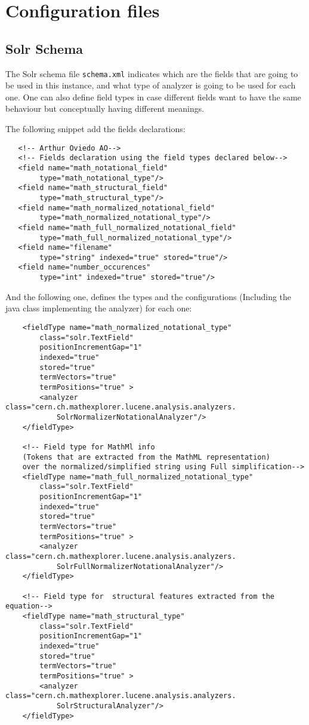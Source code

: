 \chapter{Configuration files}

\section{Solr Schema}
The Solr schema file \verb|schema.xml| indicates which are the fields that are going to be used in this instance, and what type of analyzer is going to be used for each one. One can also define field types in case different fields want to have the same behaviour but conceptually having different meanings. 

The following snippet add the fields declarations:

\begin{verbatim}
   <!-- Arthur Oviedo AO-->
   <!-- Fields declaration using the field types declared below-->
   <field name="math_notational_field" 
   		type="math_notational_type"/>
   <field name="math_structural_field" 
   		type="math_structural_type"/>
   <field name="math_normalized_notational_field" 
   		type="math_normalized_notational_type"/>
   <field name="math_full_normalized_notational_field" 
   		type="math_full_normalized_notational_type"/>
   <field name="filename" 
   		type="string" indexed="true" stored="true"/>
   <field name="number_occurences" 
   		type="int" indexed="true" stored="true"/>
\end{verbatim}

And the following one, defines the types and the configurations (Including the java class implementing the analyzer) for each one:

\begin{verbatim}
	<fieldType name="math_normalized_notational_type" 
		class="solr.TextField" 
		positionIncrementGap="1"
		indexed="true" 
		stored="true" 
		termVectors="true" 
		termPositions="true" >
		<analyzer class="cern.ch.mathexplorer.lucene.analysis.analyzers.
			SolrNormalizerNotationalAnalyzer"/>
	</fieldType>
	
	<!-- Field type for MathMl info 
	(Tokens that are extracted from the MathML representation)
	over the normalized/simplified string using Full simplification-->
	<fieldType name="math_full_normalized_notational_type" 
		class="solr.TextField" 
		positionIncrementGap="1"
		indexed="true" 
		stored="true" 
		termVectors="true" 
		termPositions="true" >
		<analyzer class="cern.ch.mathexplorer.lucene.analysis.analyzers.
			SolrFullNormalizerNotationalAnalyzer"/>
	</fieldType>
	
	<!-- Field type for  structural features extracted from the equation-->
	<fieldType name="math_structural_type" 
		class="solr.TextField" 
		positionIncrementGap="1"
		indexed="true" 
		stored="true" 
		termVectors="true" 
		termPositions="true" >
		<analyzer class="cern.ch.mathexplorer.lucene.analysis.analyzers.
			SolrStructuralAnalyzer"/>
	</fieldType>

\end{verbatim}
 
